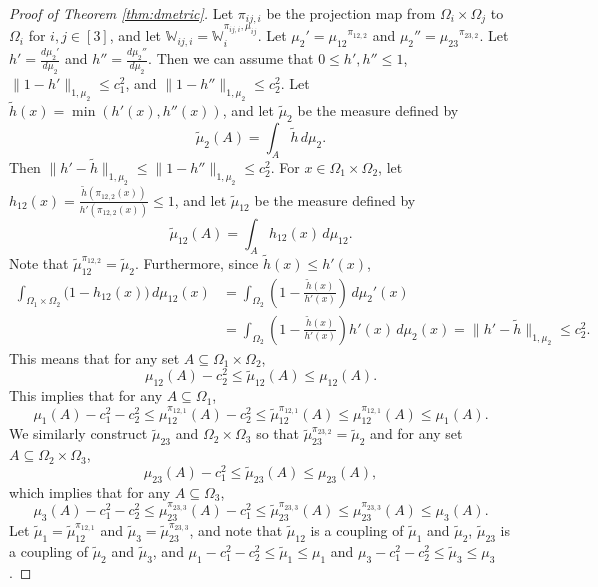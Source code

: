 \documentclass{amsart}
\numberwithin{equation}{section}
\numberwithin{figure}{section}
\theoremstyle{definition}
\theoremstyle{remark}
\newcommand{\cW}{\mathbb{W}}
\begin{document}
\begin{proof}[Proof of Theorem \ref{thm:dmetric}]
Let $\pi_{ij,i}$ be the projection map from $\Omega_i\times\Omega_j$ to
$\Omega_i$ for $i,j \in [3]$, and let
$\cW_{ij,i}=\cW_i^{\pi_{ij,i},\mu_{ij}}$. Let
$\mu_2'={\mu_{12}}^{\pi_{12,2}}$ and $\mu_2''={\mu_{23}}^{\pi_{23,2}}$. Let
$h'=\frac{d\mu_2'}{d\mu_2}$ and $h''=\frac{d\mu_2''}{d\mu_2}$. Then we can
assume that $0 \le h',h'' \le 1$, $\|1-h'\|_{1,\mu_2} \le c_1^2$, and
$\|1-h''\|_{1,\mu_2} \le c_2^2$. Let $\widetilde{h}(x)=\min(h'(x),h''(x))$,
and let $\widetilde{\mu}_2$ be the measure defined by
\[\widetilde{\mu}_2(A) =\int_A \widetilde{h} \,d\mu_2
.\] Then $\|h'-\widetilde{h}\|_{1,\mu_2} \le \|1-h''\|_{1,\mu_2} \le c_2^2$.
For $x \in \Omega_1 \times \Omega_2$, let
$h_{12}(x)=\frac{\widetilde{h}(\pi_{12,2}(x))}{h'(\pi_{12,2}(x))}\le 1$, and
let $\widetilde{\mu}_{12}$ be the measure defined by
\[\widetilde{\mu}_{12}(A)=\int_A h_{12}(x) \,d\mu_{12}
.\] Note that $\widetilde{\mu}_{12}^{\pi_{12,2}}=\widetilde{\mu}_2$.
Furthermore, since $\tilde h(x)\le h'(x)$,
\begin{align*}
\int_{\Omega_1
\times \Omega_2} \bigl(1-h_{12}(x)\bigr)
\,d\mu_{12}(x)
&=\int_{\Omega_2}\left(1-\frac{\widetilde{h}(x)}{h'(x)}\right)
\,d\mu_2'(x)
\\
&=\int_{\Omega_2}\left(1-\frac{\widetilde{h}(x)}{h'(x)}\right)
h'(x)\,d\mu_2(x)
= \|h'-\widetilde{h}\|_{1,\mu_2}
\le c_2^2 .
\end{align*}
This means that for any set $A \subseteq \Omega_1 \times \Omega_2$,
\[\mu_{12}(A)-c_2^2 \le \widetilde{\mu}_{12}(A) \le \mu_{12}(A).\]
This implies that for any $A \subseteq \Omega_1$,
\[\mu_1(A) -c_1^2-c_2^2 \le \mu_{12}^{\pi_{12,1}}(A)-c_2^2 \le \widetilde{\mu}_{12}^{\pi_{12,1}}(A) \le \mu_{12}^{\pi_{12,1}}(A) \le \mu_1(A)
.\] We similarly construct $\widetilde{\mu}_{23}$ and $\Omega_2 \times
\Omega_3$ so that $\widetilde{\mu}_{23}^{\pi_{23,2}}=\widetilde{\mu}_2$ and
for any set $A \subseteq \Omega_2 \times \Omega_3$,
\[\mu_{23}(A)-c_1^2 \le \widetilde{\mu}_{23}(A) \le \mu_{23}(A),\]
which implies that for any $A \subseteq \Omega_3$,
\[\mu_3(A) -c_1^2-c_2^2 \le \mu_{23}^{\pi_{23,3}}(A)-c_1^2 \le \widetilde{\mu}_{23}^{\pi_{23,3}}(A) \le \mu_{23}^{\pi_{23,3}}(A) \le \mu_3(A)
.\] Let $\widetilde{\mu}_1=\widetilde{\mu}_{12}^{\pi_{12,1}}$ and
$\widetilde{\mu}_3=\widetilde{\mu}_{23}^{\pi_{23,3}}$, and note that
$\widetilde{\mu}_{12}$ is a coupling of $\widetilde{\mu}_{1}$ and
$\widetilde{\mu}_{2}$, $\widetilde{\mu}_{23}$ is a coupling of
$\widetilde{\mu}_{2}$ and $\widetilde{\mu}_{3}$, and
$\mu_1-c_1^2-c_2^2\leq\widetilde\mu_1\leq\mu_1$ and
$\mu_3-c_1^2-c_2^2\leq\widetilde\mu_3\leq\mu_3$.


\end{proof}
\end{document}

